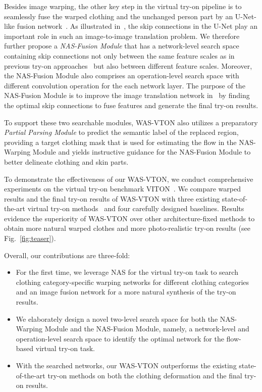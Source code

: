 \documentclass[sigconf]{acmart}
\begin{document}
Besides image warping, the other key step in the virtual try-on pipeline is to seamlessly fuse the warped clothing and the unchanged person part by an U-Net-like fusion network~\cite{xintong2018viton,bochao2018cpvton,han2020acgpn}. As illustrated in~\cite{pix2pix2017}, the skip connections in the U-Net play an important role in such an image-to-image translation problem. We therefore further propose a \emph{NAS-Fusion Module} that has a network-level search space containing skip connections not only between the same feature scales as in previous try-on approaches~\cite{xintong2018viton,bochao2018cpvton,yun2019vtnfp} but also between different feature scales. 
Moreover, the NAS-Fusion Module also comprises an operation-level search space with different convolution operation for the each network layer.
The purpose of the NAS-Fusion Module is to improve the image translation network in~\cite{pix2pix2017} by finding the optimal skip connections to fuse features and generate the final try-on results.

To support these two searchable modules, WAS-VTON also utilizes a preparatory \emph{Partial Parsing Module} to predict the semantic label of the replaced region, providing a target clothing mask that is used for estimating the flow in the NAS-Warping Module and yields instructive guidance for the NAS-Fusion Module to better delineate clothing and skin parts.

To demonstrate the effectiveness of our WAS-VTON, we conduct comprehensive experiments on the virtual try-on benchmark VITON~\cite{xintong2018viton}. We compare warped results and the final try-on results of WAS-VTON with three existing state-of-the-art virtual try-on methods~\cite{xintong2018viton,bochao2018cpvton,han2020acgpn} and four carefully designed baselines.
Results evidence the superiority of WAS-VTON over other architecture-fixed methods to obtain more natural warped clothes and more photo-realistic try-on results (see Fig.~\ref{fig:teaser}).

Overall, our contributions are three-fold:
\begin{itemize}[itemsep=1pt,topsep=1pt]
\item For the first time, we leverage NAS for the virtual try-on task to search clothing category-specific warping networks for different clothing categories
and an image fusion network for a more natural synthesis of the try-on results.
\item We elaborately design a novel two-level search space for both the NAS-Warping Module and the NAS-Fusion Module, namely, a network-level and operation-level search space to identify the optimal network for the flow-based virtual try-on task.
\item With the searched networks, our WAS-VTON outperforms the existing state-of-the-art try-on methods on both the clothing deformation and the 
final try-on results.
\end{itemize}
\end{document}

